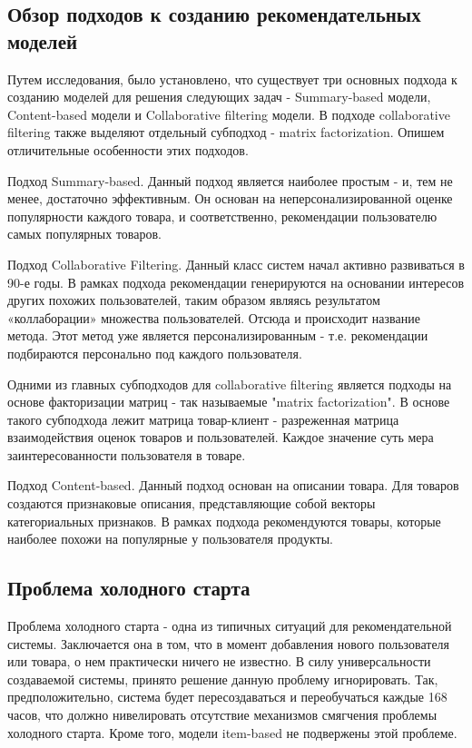 \documentclass[14pt]{mmcs_article}
\begin{document}
\subsection{Обзор подходов к созданию рекомендательных моделей}
Путем исследования, было установлено, что существует три основных подхода к созданию моделей для решения следующих задач - Summary-based модели, Content-based модели и Collaborative filtering модели. В подходе collaborative filtering также выделяют отдельный субподход - matrix factorization.  Опишем отличительные особенности этих подходов. 

Подход Summary-based. Данный подход является наиболее простым - и, тем не менее, достаточно эффективным. Он основан на неперсонализированной оценке популярности каждого товара, и соответственно, рекомендации пользователю самых популярных товаров.

Подход Collaborative Filtering. Данный класс систем начал активно развиваться в 90-е годы. В рамках подхода рекомендации генерируются на основании интересов других похожих пользователей, таким образом являясь результатом «коллаборации» множества пользователей. Отсюда и  происходит название метода. Этот метод уже является персонализированным - т.е. рекомендации подбираются персонально под каждого пользователя.

Одними из главных субподходов для collaborative filtering является подходы на основе факторизации матриц - так называемые "matrix factorization". В основе такого субподхода лежит матрица товар-клиент - разреженная матрица взаимодействия оценок товаров и пользователей. Каждое значение суть мера заинтересованности пользователя в товаре. 

Подход  Content-based. Данный подход основан на описании товара. Для товаров создаются признаковые описания, представляющие собой векторы категориальных признаков.
В рамках подхода рекомендуются товары, которые наиболее похожи на популярные у пользователя продукты.

\subsection{Проблема холодного старта}
Проблема холодного старта - одна из типичных ситуаций для рекомендательной системы. Заключается она в том, что в момент добавления нового пользователя или товара, о нем практически ничего не известно. В силу универсальности создаваемой системы, принято решение данную проблему игнорировать. Так, предположительно, система будет пересоздаваться и переобучаться каждые 168 часов, что должно нивелировать отсутствие механизмов смягчения проблемы холодного старта. Кроме того, модели item-based не подвержены этой проблеме.
\end{document}
